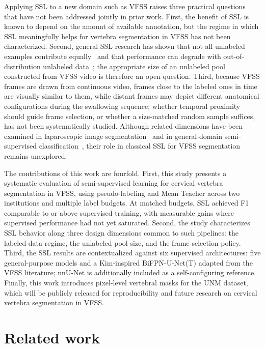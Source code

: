 \documentclass[a4paper,fleqn]{cas-dc}
\begin{document}
Applying SSL to a new domain such as VFSS raises three practical questions that have not been addressed jointly in prior work.
First, the benefit of SSL is known to depend on the amount of available annotation, but the regime in which SSL meaningfully helps for vertebra segmentation in VFSS has not been characterized.
Second, general SSL research has shown that not all unlabeled examples contribute equally~\citep{ref_ren2020} and that performance can degrade with out-of-distribution unlabeled data~\citep{ref_oliver2018}; the appropriate size of an unlabeled pool constructed from VFSS video is therefore an open question.
Third, because VFSS frames are drawn from continuous video, frames close to the labeled ones in time are visually similar to them, while distant frames may depict different anatomical configurations during the swallowing sequence; whether temporal proximity should guide frame selection, or whether a size-matched random sample suffices, has not been systematically studied.
Although related dimensions have been examined in laparoscopic image segmentation~\citep{ref_fu2019} and in general-domain semi-supervised classification~\citep{ref_rdss2024}, their role in classical SSL for VFSS segmentation remains unexplored.

The contributions of this work are fourfold. First, this study presents a systematic evaluation of semi-supervised learning for cervical vertebra segmentation in VFSS, using pseudo-labeling and Mean Teacher across two institutions and multiple label budgets. At matched budgets, SSL achieved F1 comparable to or above supervised training, with measurable gains where supervised performance had not yet saturated. Second, the study characterizes SSL behavior along three design dimensions common to such pipelines: the labeled data regime, the unlabeled pool size, and the frame selection policy. Third, the SSL results are contextualized against six supervised architectures: five general-purpose models and a Kim-inspired BiFPN-U-Net(T) adapted from the VFSS literature; nnU-Net is additionally included as a self-configuring reference. Finally, this work introduces pixel-level vertebral masks for the UNM dataset, which will be publicly released for reproducibility and future research on cervical vertebra segmentation in VFSS.

\section{Related work}
\label{sec:related}
\end{document}
